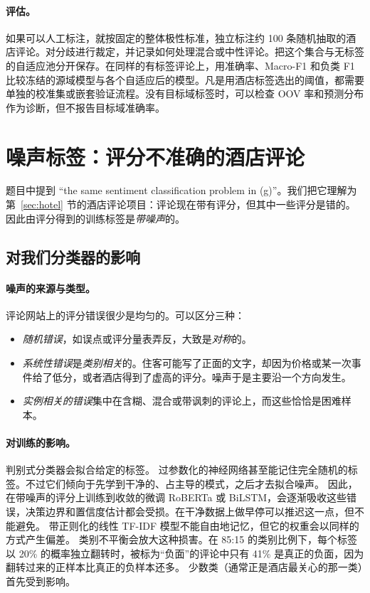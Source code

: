 \documentclass[11pt,a4paper]{article}
\begin{document}
\paragraph{评估。}
如果可以人工标注，就按固定的整体极性标准，独立标注约 100 条随机抽取的酒店评论。对分歧进行裁定，并记录如何处理混合或中性评论。把这个集合与无标签的自适应池分开保存。在同样的有标签评论上，用准确率、Macro-F1 和负类 F1 比较冻结的源域模型与各个自适应后的模型。凡是用酒店标签选出的阈值，都需要单独的校准集或嵌套验证流程。没有目标域标签时，可以检查 OOV 率和预测分布作为诊断，但不报告目标域准确率。

\section{噪声标签：评分不准确的酒店评论}\label{sec:noise}

题目中提到 ``the same sentiment classification problem in (g)''。我们把它理解为第~\ref{sec:hotel} 节的酒店评论项目：评论现在带有评分，但其中一些评分是错的。
因此由评分得到的训练标签是\emph{带噪声}的。

\subsection{对我们分类器的影响}

\paragraph{噪声的来源与类型。}
评论网站上的评分错误很少是均匀的\cite{song2023learning}。可以区分三种：
\begin{itemize}
  \item \emph{随机错误}，如误点或评分量表弄反，大致是\emph{对称}的。
  \item \emph{系统性错误}是\emph{类别相关}的。住客可能写了正面的文字，却因为价格或某一次事件给了低分，或者酒店得到了虚高的评分。噪声于是主要沿一个方向发生。
  \item \emph{实例相关的错误}集中在含糊、混合或带讽刺的评论上，而这些恰恰是困难样本。
\end{itemize}

\paragraph{对训练的影响。}
判别式分类器会拟合给定的标签。
过参数化的神经网络甚至能记住完全随机的标签。不过它们倾向于先学到干净的、占主导的模式，之后才去拟合噪声。
因此，在带噪声的评分上训练到收敛的微调 RoBERTa 或 BiLSTM，会逐渐吸收这些错误，决策边界和置信度估计都会受损。在干净数据上做早停可以推迟这一点，但不能避免。
带正则化的线性 TF-IDF 模型不能自由地记忆，但它的权重会以同样的方式产生偏差。
类别不平衡会放大这种损害。在 85:15 的类别比例下，每个标签以 20\% 的概率独立翻转时，被标为``负面''的评论中只有 41\% 是真正的负面，因为翻转过来的正样本比真正的负样本还多。
少数类（通常正是酒店最关心的那一类）首先受到影响。
\end{document}
